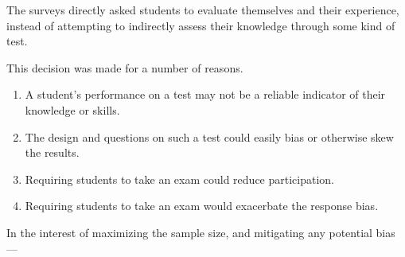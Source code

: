     







    The surveys directly asked students to evaluate themselves and their experience, instead of attempting to indirectly assess their knowledge through some kind of test. %







This decision was made for a number of reasons. 







    \begin{enumerate}







        \item A student's performance on a test may not be a reliable indicator of their knowledge or skills.







        \item The design and questions on such a test could easily bias or otherwise skew the results. 







        \item Requiring students to take an exam could reduce participation. 







        \item Requiring students to take an exam would exacerbate the response bias.







    \end{enumerate}















    In the interest of maximizing the sample size, and mitigating any potential bias ---%







